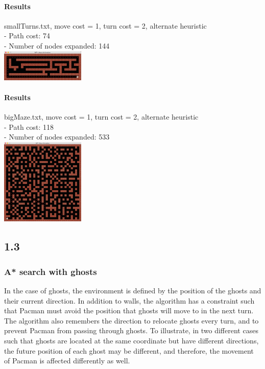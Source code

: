 \begin{multicols*}{2}
\paragraph{Results}
smallTurns.txt, move cost = 1, turn cost = 2, alternate heuristic\\
- Path cost: 74\\
- Number of nodes expanded: 144\\
\includegraphics[width=0.3\textwidth]{graphics/smallTurn_alt12.png}

\paragraph{Results}
bigMaze.txt, move cost = 1, turn cost = 2, alternate heuristic\\
- Path cost: 118\\
- Number of nodes expanded: 533\\
\includegraphics[width=0.3\textwidth]{graphics/bigMaze_alt12.png}

\subsection*{1.3}
\subsubsection*{A* search with ghosts}
In the case of ghosts, the environment is defined by the position of the ghosts and their current direction. In addition to walls, the algorithm has a constraint such that Pacman must avoid the position that ghosts will move to in the next turn. The algorithm also remembers the direction to relocate ghosts every turn, and to prevent Pacman from passing through ghosts. To illustrate, in two different cases such that ghosts are located at the same coordinate but have different directions, the future position of each ghost may be different, and therefore, the movement of Pacman is affected differently as well.


\end{multicols*}
